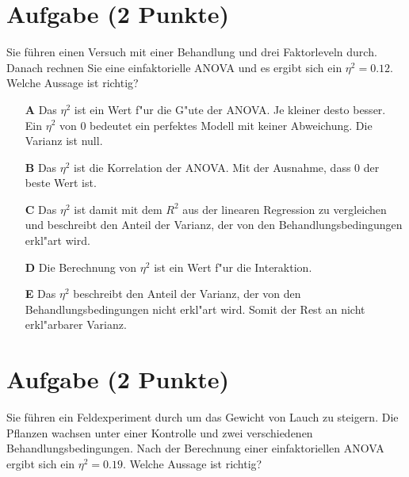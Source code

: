 \documentclass[a4paper, 9pt]{scrartcl}\usepackage[]{graphicx}\usepackage[]{xcolor}
\begin{document}
\section{Aufgabe \hfill (2 Punkte)}





Sie führen einen Versuch mit einer Behandlung und drei Faktorleveln durch. Danach rechnen Sie eine einfaktorielle ANOVA und es ergibt sich ein $\eta^2 = 0.12$. Welche Aussage ist richtig?



\begin{enumerate}
\item [\textbf{A} \msquare] Das $\eta^2$ ist ein Wert f{"u}r die G{"u}te der ANOVA. Je kleiner desto besser. Ein $\eta^2$ von 0 bedeutet ein perfektes Modell mit keiner Abweichung. Die Varianz ist null.
\item [\textbf{B} \msquare] Das $\eta^2$ ist die Korrelation der ANOVA. Mit der Ausnahme, dass 0 der beste Wert ist.
\item [\textbf{C} \msquare] Das $\eta^2$ ist damit mit dem $R^2$ aus der linearen Regression zu vergleichen und beschreibt den Anteil der Varianz, der von den Behandlungsbedingungen erkl{"a}rt wird.
\item [\textbf{D} \msquare] Die Berechnung von $\eta^2$ ist ein Wert f{"u}r die Interaktion.
\item [\textbf{E} \msquare] Das $\eta^2$ beschreibt den Anteil der Varianz, der von den Behandlungsbedingungen nicht erkl{"a}rt wird. Somit der Rest an nicht erkl{"a}rbarer Varianz.
\end{enumerate} 

\section{Aufgabe \hfill (2 Punkte)}



Sie führen ein Feldexperiment durch um das Gewicht von Lauch zu
steigern. Die Pflanzen wachsen unter einer Kontrolle und zwei verschiedenen
Behandlungsbedingungen. Nach der Berechnung einer einfaktoriellen ANOVA
ergibt sich ein $\eta^2 = 0.19$. Welche Aussage ist richtig?
\end{document}
